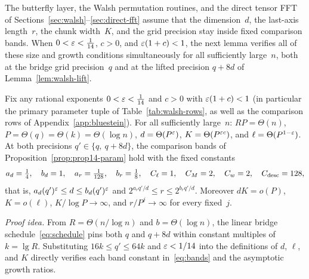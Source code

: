 The butterfly layer, the Walsh permutation routines, and the direct tensor FFT of
Sections~\ref{sec:walsh}--\ref{sec:direct-fft} assume that the dimension~$d$, the last-axis length~$r$, the chunk
width~$K$, and the grid precision stay inside fixed comparison bands. When $0<\varepsilon<\frac1{14}$, $c>0$, and
$\varepsilon(1+c)<1$, the next lemma verifies all of these size and growth conditions simultaneously for all sufficiently
large~$n$, both at the bridge grid precision~$q$ and at the lifted precision $q+8d$ of Lemma~\ref{lem:walsh-lift}.

\begin{lemma}\label{lem:root-family}
Fix any rational exponents $0<\varepsilon<\frac1{14}$ and $c>0$ with $\varepsilon(1+c)<1$ (in particular the primary parameter tuple
of Table~\ref{tab:walsh-rows}, as well as the comparison rows of Appendix~\ref{app:bluestein}). For all sufficiently
large~$n$: $RP=\Theta(n)$, $P=\Theta(q)=\Theta(k)=\Theta(\log n)$, $d=\Theta(P^\varepsilon)$, $K=\Theta(P^{\varepsilon c})$, and
$\ell=\Theta(P^{1-\varepsilon})$. At both precisions $q'\in\{q,\ q+8d\}$, the comparison bands of
Proposition~\ref{prop:prop14-param} hold with the fixed constants
\begin{equation}\label{eq:bands}
  a_d=\tfrac14,\quad b_d=1,\quad a_r=\tfrac1{128},\quad b_r=\tfrac18,\quad C_\ell=1,\quad C_M=2,\quad C_w=2,\quad
  C_{\rm desc}=128,
\end{equation}
that is, $a_d(q')^{\varepsilon}\le d\le b_d(q')^{\varepsilon}$ and $2^{a_rq'/d}\le r\le2^{b_rq'/d}$. Moreover $dK=o(P)$, $K=o(\ell)$,
$K/\log P\to\infty$, and $r/P^j\to\infty$ for every fixed~$j$.
\end{lemma}

\emph{Proof idea.} From $R=\Theta(n/\log n)$ and $b=\Theta(\log n)$, the linear bridge schedule~\eqref{eq:schedule} pins
both $q$ and $q+8d$ within constant multiples of $k=\lg R$. Substituting $16k\le q'\le 64k$ and $\varepsilon<1/14$ into the
definitions of $d$, $\ell$, and $K$ directly verifies each band constant in~\eqref{eq:bands} and the asymptotic growth
ratios.

